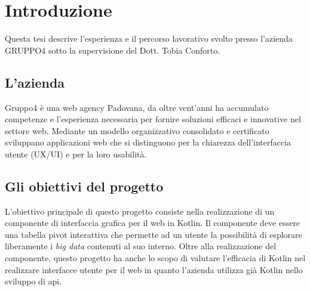 
\chapter{Introduzione}
\label{cap:introduzione}

Questa tesi descrive l'esperienza e il percorso lavorativo svolto presso l'azienda GRUPPO4 sotto la supervisione del Dott. Tobia Conforto.

\section{L'azienda}
Gruppo4 è una web agency Padovana, da oltre vent'anni ha accumulato competenze e l'esperienza necessaria per fornire soluzioni efficaci e innovative nel settore web. Mediante un modello organizzativo consolidato e certificato sviluppano applicazioni web che si distinguono per la chiarezza dell'interfaccia utente (UX/UI) e per la loro usabilità.

\section{Gli obiettivi del progetto}
L'obiettivo principale di questo progetto consiste nella realizzazione di un componente di interfaccia grafica per il web in Kotlin. Il componente deve essere una tabella pivot interattiva che permette ad un utente la possibilità di esplorare liberamente i \emph{big data} contenuti al suo interno. Oltre alla realizzazione del componente, questo progetto ha anche lo scopo di valutare l'efficacia di Kotlin nel realizzare interfacce utente per il web in quanto l'azienda utilizza già Kotlin nello sviluppo di \gls{api}.

